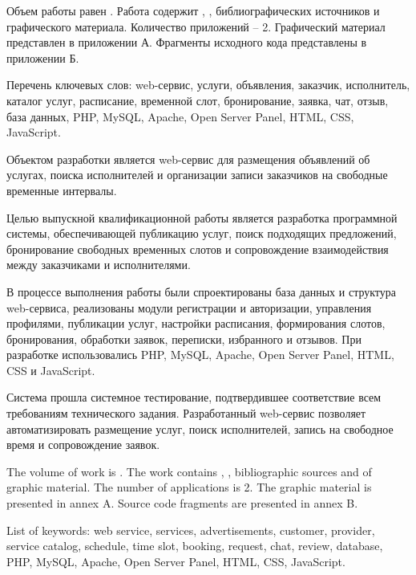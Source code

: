 
Объем работы равен . Работа содержит , ,  библиографических источников и  графического материала. Количество приложений – 2. Графический материал представлен в приложении А. Фрагменты исходного кода представлены в приложении Б.

Перечень ключевых слов: web-сервис, услуги, объявления, заказчик, исполнитель, каталог услуг, расписание, временной слот, бронирование, заявка, чат, отзыв, база данных, PHP, MySQL, Apache, Open Server Panel, HTML, CSS, JavaScript.

Объектом разработки является web-сервис для размещения объявлений об услугах, поиска исполнителей и организации записи заказчиков на свободные временные интервалы.

Целью выпускной квалификационной работы является разработка программной системы, обеспечивающей публикацию услуг, поиск подходящих предложений, бронирование свободных временных слотов и сопровождение взаимодействия между заказчиками и исполнителями.

В процессе выполнения работы были спроектированы база данных и структура web-сервиса, реализованы модули регистрации и авторизации, управления профилями, публикации услуг, настройки расписания, формирования слотов, бронирования, обработки заявок, переписки, избранного и отзывов. При разработке использовались PHP, MySQL, Apache, Open Server Panel, HTML, CSS и JavaScript.

Система прошла системное тестирование, подтвердившее соответствие всем требованиям технического задания. Разработанный web-сервис позволяет автоматизировать размещение услуг, поиск исполнителей, запись на свободное время и сопровождение заявок.


The volume of work is . The work contains , ,  bibliographic sources and  of graphic material. The number of applications is 2. The graphic material is presented in annex A. Source code fragments are presented in annex B.

List of keywords: web service, services, advertisements, customer, provider, service catalog, schedule, time slot, booking, request, chat, review, database, PHP, MySQL, Apache, Open Server Panel, HTML, CSS, JavaScript.

